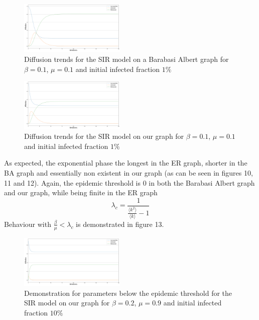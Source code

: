 \documentclass[sigchi]{acmart}
\begin{document}
\begin{figure}[!htbp]
    \centering
    \includegraphics[width=0.45\textwidth]{img/SIR/diffusionBASIR_beta=0.1_mu0.1_frac=0.01.png}
    \caption{Diffusion trends for the SIR model on a Barabasi Albert graph for $\beta = 0.1$, $\mu = 0.1$ and initial infected fraction $1\%$}
    \label{fig:my_label}
\end{figure}
\begin{figure}[!htbp]
    \centering
    \includegraphics[width=0.45\textwidth]{img/SIR/diffusionOurSIR_beta=0.1_mu0.1_frac=0.01.png}
    \caption{Diffusion trends for the SIR model on our graph for $\beta = 0.1$, $\mu = 0.1$ and initial infected fraction $1\%$}
    \label{fig:my_label}
\end{figure}
As expected, the exponential phase the longest in the ER graph, shorter in the BA graph and essentially non existent in our graph (as can be seen in figures 10, 11 and 12). Again, the epidemic threshold is $0$ in both the Barabasi Albert graph and our graph, while being finite in the ER graph $$\lambda_c = \frac{1}{\frac{\langle k^2 \rangle}{\langle k \rangle}-1}$$
Behaviour with $\frac{\beta}{\mu} < \lambda_c$ is demonstrated in figure 13.


\begin{figure}[!htbp]
    \centering
    \includegraphics[width=0.45\textwidth]{img/SIR/dyingDemonstration.png}
    \caption{Demonstration for parameters below the epidemic threshold for the SIR model on our graph for $\beta = 0.2$, $\mu = 0.9$ and initial infected fraction $10\%$}
    \label{fig:my_label}
\end{figure}
\end{document}

